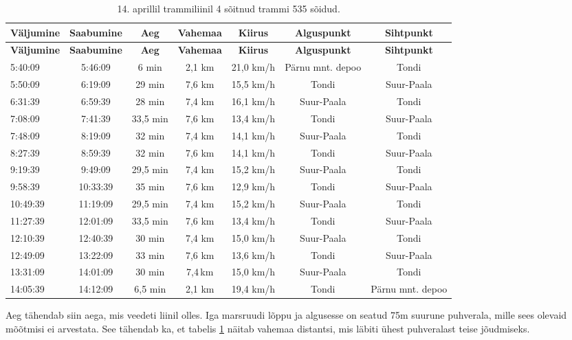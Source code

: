 \begin{longtable}{|l|c|c|c|c|c|c|}
\caption{14. aprillil trammiliinil 4 sõitnud trammi 535 sõidud.}
\label{tab:valideeringLiin4}\\ \hline %
\textbf{Väljumine}  &  \textbf{Saabumine} & \textbf{Aeg} & \textbf{Vahemaa} & \textbf{Kiirus} & \textbf{Alguspunkt} & \textbf{Sihtpunkt} \\ \hline
\endfirsthead
\hline
\textbf{Väljumine}  &  \textbf{Saabumine} & \textbf{Aeg} & \textbf{Vahemaa} & \textbf{Kiirus} & \textbf{Alguspunkt} & \textbf{Sihtpunkt} \\ \hline
\endhead
5:40:09 & 5:46:09  & 6 min & 2,1 km & 21,0 km/h & Pärnu mnt. depoo & Tondi \\ \hline
5:50:09 & 6:19:09  & 29 min & 7,6 km & 15,5 km/h & Tondi & Suur-Paala \\ \hline
6:31:39 & 6:59:39 & 28 min & 7,4 km & 16,1 km/h & Suur-Paala & Tondi \\ \hline
7:08:09 & 7:41:39  & 33,5 min & 7,6 km & 13,4 km/h & Tondi & Suur-Paala \\ \hline
7:48:09 & 8:19:09  & 32 min & 7,4 km & 14,1 km/h & Suur-Paala & Tondi \\ \hline
8:27:39 & 8:59:39  & 32 min & 7,6 km & 14,1 km/h & Tondi & Suur-Paala \\ \hline
9:19:39 & 9:49:09 & 29,5 min & 7,4 km & 15,2 km/h & Suur-Paala & Tondi \\ \hline
9:58:39 & 10:33:39  & 35 min & 7,6 km & 12,9 km/h & Tondi & Suur-Paala \\ \hline
10:49:39 & 11:19:09 & 29,5 min & 7,4 km & 15,2 km/h & Suur-Paala & Tondi \\ \hline
11:27:39 & 12:01:09  & 33,5 min & 7,6 km & 13,4 km/h & Tondi & Suur-Paala \\ \hline
12:10:39 & 12:40:39  & 30 min & 7,4 km & 15,0 km/h & Suur-Paala & Tondi \\ \hline
12:49:09 & 13:22:09  & 33 min & 7,6 km & 13,6 km/h & Tondi & Suur-Paala \\ \hline
13:31:09 & 14:01:09  & 30 min & 7,4\,km & 15,0 km/h & Suur-Paala & Tondi \\ \hline
14:05:39 & 14:12:09  & 6,5 min & 2,1 km & 19,4 km/h & Tondi & Pärnu mnt. depoo \\ \hline
\end{longtable}
Aeg tähendab siin aega, mis veedeti liinil olles. Iga marsruudi lõppu ja algusesse on seatud 75m suurune puhverala, mille sees olevaid mõõtmisi ei arvestata. See tähendab ka, et tabelis \ref{tab:valideeringLiin4} näitab vahemaa distantsi, mis läbiti ühest puhveralast teise jõudmiseks.

